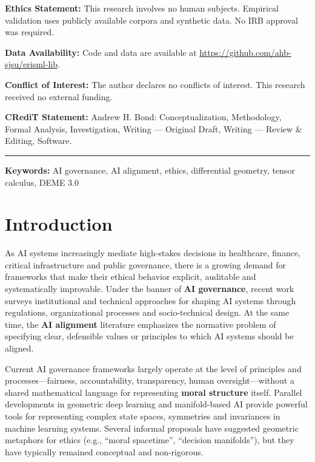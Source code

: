 \documentclass[12pt]{article}
\theoremstyle{remark}
\begin{document}
\begin{titlepage}
\noindent\textbf{Ethics Statement:} This research involves no human subjects. Empirical validation uses publicly available corpora and synthetic data. No IRB approval was required.

\noindent\textbf{Data Availability:} Code and data are available at \url{https://github.com/ahb-sjsu/erisml-lib}.

\noindent\textbf{Conflict of Interest:} The author declares no conflicts of interest. This research received no external funding.

\noindent\textbf{CRediT Statement:} Andrew H. Bond: Conceptualization, Methodology, Formal Analysis, Investigation, Writing --- Original Draft, Writing --- Review \& Editing, Software.
\noindent\rule{\linewidth}{0.4pt}
\normalsize

\end{titlepage}

\noindent\textbf{Keywords:} AI governance, AI alignment, ethics, differential geometry, tensor calculus, DEME 3.0

\section{Introduction}

As AI systems increasingly mediate high-stakes decisions in healthcare, finance, critical infrastructure and public governance, there is a growing demand for frameworks that make their ethical behavior explicit, auditable and systematically improvable. Under the banner of \textbf{AI governance}, recent work surveys institutional and technical approaches for shaping AI systems through regulations, organizational processes and socio-technical design. At the same time, the \textbf{AI alignment} literature emphasizes the normative problem of specifying clear, defensible values or principles to which AI systems should be aligned.

Current AI governance frameworks largely operate at the level of principles and processes---fairness, accountability, transparency, human oversight---without a shared mathematical language for representing \textbf{moral structure} itself. Parallel developments in geometric deep learning and manifold-based AI provide powerful tools for representing complex state spaces, symmetries and invariances in machine learning systems. Several informal proposals have suggested geometric metaphors for ethics (e.g., ``moral spacetime'', ``decision manifolds''), but they have typically remained conceptual and non-rigorous.
\end{document}
